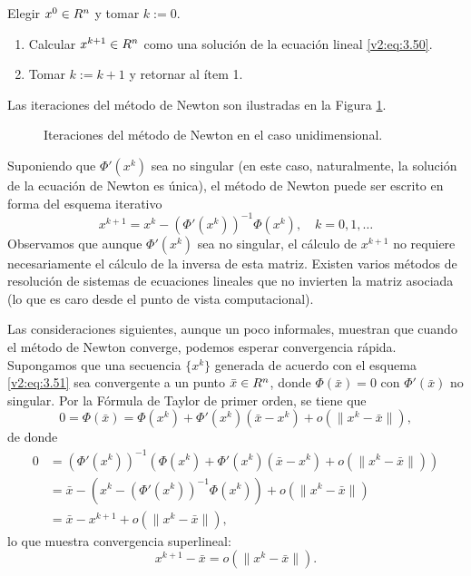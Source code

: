 \begin{algorithm}
Elegir $x^0 \in R^n$ y tomar $k:=0$.
\begin{enumerate}
    \item Calcular $x^{k+1} \in R^n$ como una solución de la ecuación lineal \eqref{v2:eq:3.50}.
    \item Tomar $k := k + 1$ y retornar al ítem 1.
\end{enumerate}
\end{algorithm}

Las iteraciones del método de Newton son ilustradas en la Figura \ref{v2:fig:3.2.1}.

\begin{figure}[htpb]
    \centering
    \caption{Iteraciones del método de Newton en el caso unidimensional.}
    \label{v2:fig:3.2.1}
\end{figure}

Suponiendo que $\Phi'(x^k)$ sea no singular (en este caso, naturalmente, la solución de la ecuación de Newton es única), el método de Newton puede ser escrito en forma del esquema iterativo
\begin{equation}
    x^{k+1} = x^k - (\Phi'(x^k))^{-1}\Phi(x^k), \quad k = 0, 1, \dots
    \label{v2:eq:3.51}
\end{equation}
Observamos que aunque $\Phi'(x^k)$ sea no singular, el cálculo de $x^{k+1}$ no requiere necesariamente el cálculo de la inversa de esta matriz. Existen varios métodos de resolución de sistemas de ecuaciones lineales que no invierten la matriz asociada (lo que es caro desde el punto de vista computacional).

Las consideraciones siguientes, aunque un poco informales, muestran que cuando el método de Newton converge, podemos esperar convergencia rápida. Supongamos que una secuencia $\{x^k\}$ generada de acuerdo con el esquema \eqref{v2:eq:3.51} sea convergente a un punto $\bar{x} \in R^n$, donde $\Phi(\bar{x}) = 0$ con $\Phi'(\bar{x})$ no singular. Por la Fórmula de Taylor de primer orden, se tiene que
\[
    0 = \Phi(\bar{x}) = \Phi(x^k) + \Phi'(x^k)(\bar{x} - x^k) + o(\|x^k - \bar{x}\|),
\]
de donde
\begin{align*}
    0 &= (\Phi'(x^k))^{-1}(\Phi(x^k) + \Phi'(x^k)(\bar{x} - x^k) + o(\|x^k - \bar{x}\|)) \\
      &= \bar{x} - (x^k - (\Phi'(x^k))^{-1}\Phi(x^k)) + o(\|x^k - \bar{x}\|) \\
      &= \bar{x} - x^{k+1} + o(\|x^k - \bar{x}\|),
\end{align*}
lo que muestra convergencia superlineal:
\[
    x^{k+1} - \bar{x} = o(\|x^k - \bar{x}\|).
\]

